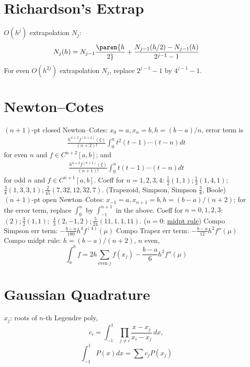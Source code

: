 \documentclass[9pt]{memoir}
\begin{document}
\begin{multicols*}{3}
    \section{Richardson's Extrap}
    \s $O(h^j)$ extrapolation $N_j$:
    $$ N_j(h) = N_{j-1}\paren{h \over 2} + \frac{N_{j-1}(h/2)-N_{j-1}(h)}{2^{j-1}-1} $$
    \s For even $O(h^{2j})$ extrapolation $N_j$, replace $2^{j-1}-1$ by $4^{j-1}-1$.

    \section{Newton--Cotes}
    \s $(n+1)$-pt closed Newton--Cotes: $x_0=a,x_n=b,h=(b-a)/n$, error term is
    \begin{align*}
        \frac{h^{n+3}f^{(n+2)}(\xi)}{(n+2)!}\int_0^n t^2(t-1)\cdots (t-n)dt
    \end{align*}
    for even $n$ and $f\in C^{n+2}[a,b]$; and
    \begin{align*}
        \frac{h^{n+2}f^{(n+1)}(\xi)}{(n+1)!}\int_0^n t(t-1)\cdots (t-n)dt
    \end{align*}
    for odd $n$ and $f\in C^{n+1}[a,b]$.\nl
    \s Coeff for $n=1,2,3,4$: $\frac 12(1,1); \frac13(1,4,1); $\nl
    $\frac38(1,3,3,1); \frac{2}{45}(7,32,12,32,7).$ (Trapezoid, Simpson, Simpson $\frac 38$, Boole)\nl
    \s $(n+1)$-pt open Newton--Cotes: $x_{-1}=a,x_{n+1}=b,h=(b-a)/(n+2)$; \nl for the error term, replace $\int_0^n$ by $\int_{-1}^{n+1}$ in the above. \nl
    \s Coeff for $n=0,1,2,3$: $(2); \frac32(1,1); $\nl
    $\frac43 (2,-1,2); \frac 5{24}(11,1,1,11)$. ($n=0$: \uline{midpt rule}) \nl
    \s Compo Simpson err term: $-\frac{b-a}{180}h^4 f^{(4)}(\mu)$
    \s Compo Trapez err term: $-\frac{b-a}{12}h^2 f''(\mu)$
    \s Compo midpt rule: $h=(b-a)/(n+2)$, $n$ even,
    $$ \int_a^b f = 2h\sum_{\text{even }j}f(x_j) -\frac{b-a}{6}h^2 f''(\mu)$$
    \section{Gaussian Quadrature}
    $x_j$: roots of $n$-th Legendre poly,
    $$ c_i=\int_{-1}^1 \prod_{j\ne i}\frac{x-x_j}{x_i-x_j}\,dx,$$
$$ \int_{-1}^1 P(x)dx = \sum c_j P(x_j)$$
\end{multicols*}
\end{document}
